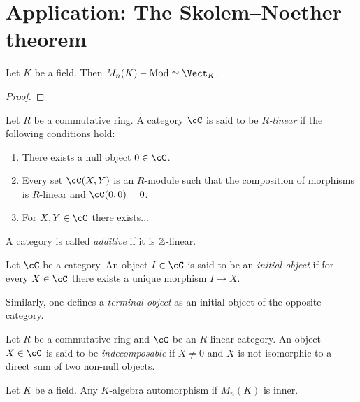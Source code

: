 \section{Application: The Skolem--Noether theorem}

\begin{proposition}
\label{pro:equivalence}
    Let $K$ be a field. Then 
    $M_n(K)-\operatorname{Mod}\simeq\Vect_K$.
\end{proposition}

\begin{proof}
    
\end{proof}

\begin{definition}
    Let $R$ be a commutative ring. A category $\cC$ is said to be 
    \emph{$R$-linear} if the following conditions hold:
    \begin{enumerate}
        \item There exists a null object $0\in\cC$. 
        \item Every set $\cC(X,Y)$ is an $R$-module 
        such that the composition of morphisms is $R$-linear and 
        $\cC(0,0)=0$. 
        \item For $X,Y\in\cC$ there exists...
    \end{enumerate}
\end{definition}

A category is called \emph{additive} if it is $\mathbb{Z}$-linear. 

\begin{definition}
    Let $\cC$ be a category. An object $I\in\cC$ is said to be
    an \emph{initial object} if for every $X\in\cC$ 
    there exists a unique morphism $I\to X$. 
\end{definition}

Similarly, one defines a \emph{terminal object} as 
an initial object of the opposite category. 

\begin{definition}
    Let $R$ be a commutative ring and 
    $\cC$ be an $R$-linear category. An object $X\in\cC$ is said 
    to be \emph{indecomposable} if $X\ne0$ and $X$ is not 
    isomorphic to a direct sum of two non-null objects. 
\end{definition}

\begin{theorem}
    Let $K$ be a field. Any $K$-algebra automorphism 
    if $M_n(K)$ is inner.
\end{theorem}

